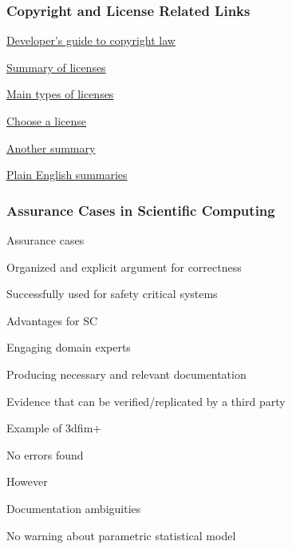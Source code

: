 \documentclass[t,12pt,numbers,fleqn]{beamer}
\begin{document}

\begin{frame}
\frametitle{Copyright and License Related Links}

\bi
\item
  \href{http://haacked.com/archive/2006/01/24/TheDevelopersGuideToCopyrightLaw-Part1.aspx/}{Developer's
    guide to copyright law}

\item \href{https://www.smashingmagazine.com/2010/03/a-short-guide-to-open-source-and-similar-licenses/}{Summary of licenses}

\item
  \href{http://haacked.com/archive/2007/04/04/there-are-only-four-software-licenses.aspx/}{Main
    types of licenses}

\item \href{http://choosealicense.com}{Choose a license}
\item \href{http://choosealicense.com/licenses/}{Another summary}
\item \href{https://tldrlegal.com}{Plain English summaries}

\ei

\end{frame}


\begin{frame}
\frametitle{Assurance Cases in Scientific Computing \cite{SmithEtAl2018_ICSEPoster}}

\bi
\item Assurance cases
\bi 
\item Organized and explicit argument for correctness
\item Successfully used for safety critical systems
\ei
\item Advantages for SC
\bi
\item Engaging domain experts
\item Producing necessary and relevant documentation
\item Evidence that can be verified/replicated by a third party
\ei
\item Example of 3dfim+
\bi
\item No errors found
\item However
\bi
\item Documentation ambiguities
\item No warning about parametric statistical model
\ei
\ei
\ei

\end{frame}
\end{document}

